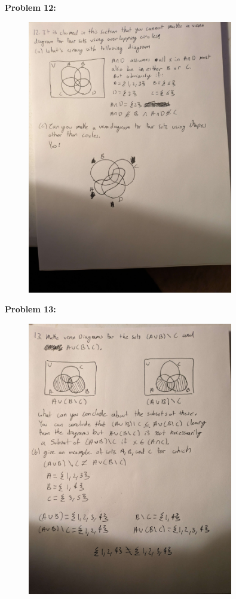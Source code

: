 \textbf{Problem 12:}
\begin{figure}[H]
    \centering
    \includegraphics[width=0.8\textwidth]{images/1.2/8.jpg}
\end{figure}

\textbf{Problem 13:}
\begin{figure}[H]
    \centering
    \includegraphics[width=0.8\textwidth]{images/1.2/9.jpg}
\end{figure}

